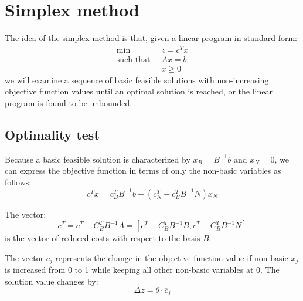 \section{Simplex method}

The idea of the simplex method is that, given a linear program in standard form: 
\begin{align*}
    \min                      \:&\: z=c^Tx              \\
    \text{such that }     &\: Ax=b                \\
                                &\: x \geq 0
\end{align*}
we will examine a sequence of basic feasible solutions with non-increasing objective function values until an optimal solution is reached, or the  linear program is 
found to be unbounded. 

\subsection{Optimality test}
Because a basic feasible solution is characterized by $x_B=B^{-1}b$ and $x_N=0$, we can express the objective function in terms of only the non-basic variables as follows:
\[c^Tx=c_B^TB^{-1}b+\left(c_N^T-c_B^TB^{-1}N\right)x_N\]
\begin{definition}
    The vector: 
    \[\overline{c}^T=c^T-C_B^TB^{-1}A=\left[c^T-C_B^TB^{-1}B,c^T-C_B^TB^{-1}N\right]\]
    is the vector of reduced costs with respect to the basis $B$. 
\end{definition}
The vector $\overline{c}_j$ represents the change in the objective function value if non-basic $x_j$ is increased from 0 to 1 while keeping all other non-basic variables at 0. 
The solution value changes by:
\[\Delta z=\theta \cdot \overline{c}_j\]


